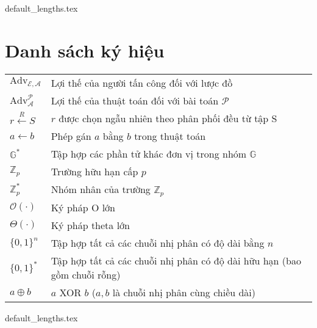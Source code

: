 \documentclass[class=report, crop=false]{standalone}
\begin{document}
	{default_lengths.tex}
	\baselineskip
	\chapter*{Danh sách ký hiệu}
	\begin{longtabu}{>{\large}p{2cm} >{\large}X[l]}
		$\text{Adv}_\mathcal{E, A}$ 			& 	Lợi thế của người tấn công \adversary đối với lược đồ \scheme 							\\
		$\text{Adv}_\mathcal{A}^\mathcal{P}$ 	& 	Lợi thế của thuật toán \algo đối với bài toán $\mathcal{P}$ 							\\
		$r \xleftarrow{R} S$ 					& 	$r$ được chọn ngẫu nhiên theo phân phối đều từ tập S 									\\
		$a \leftarrow b$ 						& 	Phép gán $a$ bằng $b$ trong thuật toán 													\\
		$\mathbb{G}^*$							& 	Tập hợp các phần tử khác đơn vị trong nhóm $\mathbb{G}$ 								\\
		$\mathbb{Z}_p$							& 	Trường hữu hạn cấp $p$ 																\\
		$\mathbb{Z}_p^*$						& 	Nhóm nhân của trường $\mathbb{Z}_p$ 														\\
		$\mathcal{O}(\cdot)$					& 	Ký pháp O lớn																			\\
		$\Theta(\cdot)$							& 	Ký pháp theta lớn																		\\
		$\{0, 1 \}^n$							& 	Tập hợp tất cả các chuỗi nhị phân có độ dài bằng $n$									\\
		$\{0, 1 \}^*$							& 	Tập hợp tất cả các chuỗi nhị phân có độ dài hữu hạn (bao gồm chuỗi rỗng)				\\
		$a \oplus b$							& 	$a$ XOR $b$	($a, b$ là chuỗi nhị phân cùng chiều dài)									\\

	\end{longtabu}
	\newpage
	{default_lengths.tex}
\end{document}
